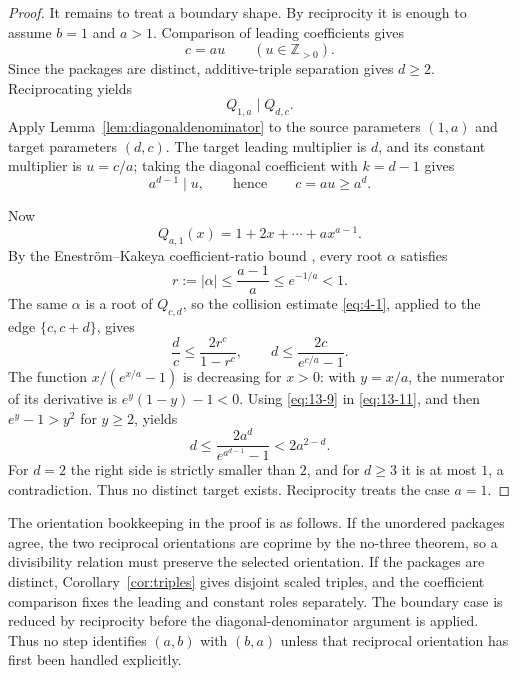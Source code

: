 \documentclass[11pt]{article}
\numberwithin{equation}{section}
\theoremstyle{definition}
\newcommand{\Z}{\mathbb Z}
\begin{document}
\begin{proof}
It remains to treat a boundary shape.  By reciprocity it is enough to assume
\(b=1\) and \(a>1\).  Comparison of leading coefficients gives
\begin{equation}
 c=au\qquad(u\in\Z_{>0}).
 \label{eq:13-8}
\end{equation}
Since the packages are distinct, additive-triple separation gives \(d\geq2\).
Reciprocating yields
\[
 Q_{1,a}\mid Q_{d,c}.
\]
Apply Lemma~\ref{lem:diagonaldenominator} to the source parameters \((1,a)\)
and target parameters \((d,c)\).  The target leading multiplier is \(d\),
and its constant multiplier is \(u=c/a\); taking the diagonal coefficient
with \(k=d-1\) gives
\begin{equation}
 a^{d-1}\mid u,
 \qquad\text{hence}\qquad c=au\geq a^d.
 \label{eq:13-9}
\end{equation}

Now
\[
 Q_{a,1}(x)=1+2x+\cdots+a x^{a-1}.
\]
By the Enestr\"om--Kakeya coefficient-ratio bound
\cite{AndersonSaffVarga1979}, every root \(\alpha\) satisfies
\begin{equation}
 r:=|\alpha|\leq\frac{a-1}{a}\leq e^{-1/a}<1.
 \label{eq:13-10}
\end{equation}
The same \(\alpha\) is a root of \(Q_{c,d}\), so the collision estimate
\eqref{eq:4-1}, applied to the edge \(\{c,c+d\}\), gives
\[
 \frac dc\leq\frac{2r^c}{1-r^c},
 \qquad
 d\leq\frac{2c}{e^{c/a}-1}.
 \label{eq:13-11}
\]
The function \(x/(e^{x/a}-1)\) is decreasing for \(x>0\): with
\(y=x/a\), the numerator of its derivative is
\(e^y(1-y)-1<0\).  Using \eqref{eq:13-9} in \eqref{eq:13-11}, and then
\(e^y-1>y^2\) for \(y\geq2\), yields
\[
 d\leq\frac{2a^d}{e^{a^{d-1}}-1}<2a^{2-d}.
\]
For \(d=2\) the right side is strictly smaller than \(2\), and for
\(d\geq3\) it is at most \(1\), a contradiction.  Thus no distinct target
exists.  Reciprocity treats the case \(a=1\).
\end{proof}

The orientation bookkeeping in the proof is as follows.  If the unordered
packages agree, the two reciprocal orientations are coprime by the no-three
theorem, so a divisibility relation must preserve the selected orientation.
If the packages are distinct, Corollary~\ref{cor:triples} gives disjoint
scaled triples, and the coefficient comparison fixes the leading and constant
roles separately.  The boundary case is reduced by reciprocity before the
diagonal-denominator argument is applied.  Thus no step identifies
\((a,b)\) with \((b,a)\) unless that reciprocal orientation has first been
handled explicitly.
\end{document}
